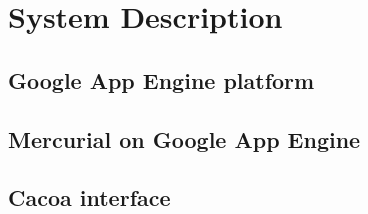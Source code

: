 \chapter{System Description}\label{chap:description}
\section{Google App Engine platform}\label{sec:gae}
\section{Mercurial on Google App Engine}\label{sec:hg_on_gae}
\section{Cacoa interface}\label{sec:cacoa} 